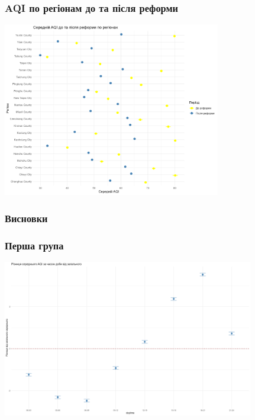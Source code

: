 \documentclass{beamer}
\begin{document}
\begin{frame}
  \frametitle{AQI по регіонам до та після реформи}

  \begin{center}
    \includegraphics[height=3in]{./plots/lab2/1-4-part/aqi_comparison_before_after.png}
  \end{center}

\end{frame}

\begin{frame}
  \frametitle{Висновки}


\end{frame}


\begin{frame}
  \frametitle{Перша група}

  \begin{center}
    \includegraphics[height=2.7in]{./plots/lab2/1-4-part/daytime_summary.png}
  \end{center}

\end{frame}
\end{document}
